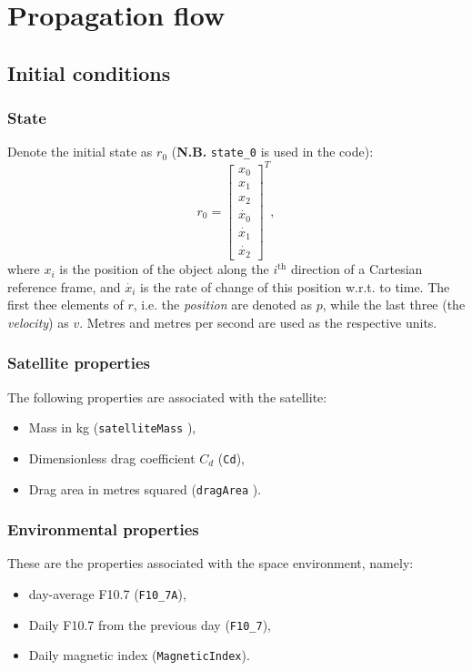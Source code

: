 \documentclass[11pt,a4paper,oneside]{report}
\begin{document}
\chapter{Propagation flow}


\section{Initial conditions}
\subsection{State}
Denote the initial state as $r_0$ (\textbf{N.B.} \verb|state_0| is used in the code):
\[
 r_0 = \begin{bmatrix}x_0 \\ x_1 \\  x_2 \\ \dot{x_0} \\ \dot{x_1} \\ \dot{x_2}\end{bmatrix}^T,
\]
where $x_i$ is the position of the object along the $i^{\textrm{th}}$ direction of a Cartesian reference frame, and $\dot{x_i}$ is the rate of change of this position w.r.t. to time.
The first thee elements of $r$, i.e. the \emph{position} are denoted as $p$, while the last three (the \emph{velocity}) as $v$.
Metres and metres per second are used as the respective units.

\subsection{Satellite properties}
The following properties are associated with the satellite:
\begin{itemize}
	\item Mass in kg (\verb|satelliteMass| ),
	\item Dimensionless drag coefficient $C_d$ (\verb|Cd|),
	\item Drag area in metres squared (\verb|dragArea| ).
\end{itemize}


\subsection{Environmental properties}
These are the properties associated with the space environment, namely:
\begin{itemize}
	\item \unit[81]{day}-average F10.7 (\verb|F10_7A|),
	\item Daily F10.7 from the previous day (\verb|F10_7|),
	\item Daily magnetic index (\verb|MagneticIndex|).
\end{itemize}
\end{document}
